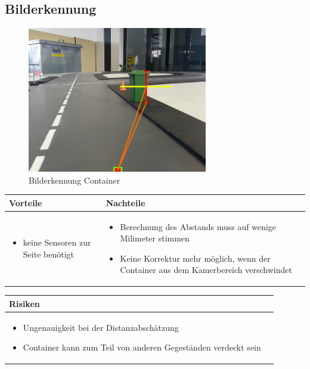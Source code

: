 \subsection{Bilderkennung}
\begin{figure}[h!]%
\centering
\includegraphics[width=0.7\textwidth]{fig/containererkennung_detailliert_bilderkennung.png}
\caption{Bilderkennung Container}
\label{fig:Bilderkennung Container}
\end{figure}
\begin{table}[h]
\begin{tabular}{p{} | p{}}


 \textbf{Vorteile} & \textbf{Nachteile} \\ \hline
	 
\begin{itemize}
\item keine Sensoren zur Seite benötigt
\end{itemize}

 
 &
 
\begin{itemize}
\item Berechnung des Abstands muss auf wenige Milimeter stimmen
\item Keine Korrektur mehr möglich, wenn der Container aus dem Kamerbereich verschwindet
\end{itemize}

\end{tabular}
\end{table}

\begin{table}[h]
\begin{tabular}{p{}p{}}


 \textbf{Risiken} & \\ \hline
	 
\begin{itemize}
\item Ungenauigkeit bei der Distanzabschätzung
\item Container kann zum Teil von anderen Gegeständen verdeckt sein
\end{itemize}

 
\end{tabular}
\end{table}

\pagebreak
